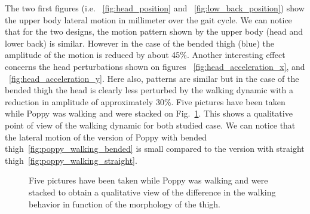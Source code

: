 The two first figures (i.e. ~\ref{fig:head_position} and ~\ref{fig:low_back_position}) show the upper body lateral motion in millimeter over the gait cycle. We can notice that for the two designs, the motion pattern shown by the upper body (head and lower back) is similar. However in the case of the bended thigh (blue) the amplitude of the motion is reduced by about 45\%. Another interesting effect concerns the head perturbations shown on figures ~\ref{fig:head_acceleration_x}, and ~\ref{fig:head_acceleration_y}. Here also, patterns are similar but in the case of the bended thigh the head is clearly less perturbed by the walking dynamic with a reduction in amplitude of approximately 30\%. Five pictures have been taken while Poppy was walking and were stacked on Fig.~\ref{fig:poppy_walking_compared}. This shows a qualitative point of view of the walking dynamic for both studied case.
We can notice that the lateral motion of the version of Poppy with bended thigh~\ref{fig:poppy_walking_bended} is small compared to the version with straight thigh~\ref{fig:poppy_walking_straight}.


\begin{figure}[h]
\centering
    \hfil
    \caption{Five pictures have been taken while Poppy was walking and were stacked to obtain a qualitative view of the difference in the walking behavior in function of the morphology of the thigh.}
    \label{fig:poppy_walking_compared}
\end{figure}


